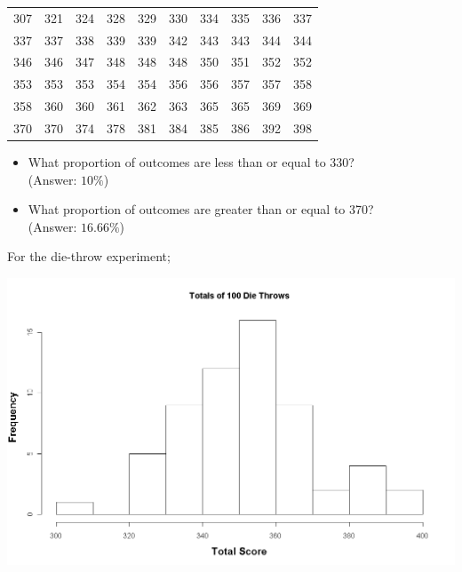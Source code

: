 \documentclass[12pt]{report}
\begin{document}
{{	
	\small
	\begin{center}
		\begin{tabular}{|c c c c c c c c c c|}
			\hline
			307 & 321 & 324 & 328 & 329 & 330 & 334 & 335 & 336 &337 \\
			337 & 337 & 338 & 339 & 339 & 342 & 343 & 343 & 344 &344 \\
			346 & 346 & 347 & 348 & 348 & 348 & 350 & 351 & 352 &352 \\
			353 & 353 & 353 & 354 & 354 & 356 & 356 & 357 & 357 &358 \\
			358 & 360 & 360 & 361 & 362 & 363 & 365 & 365 & 369 &369 \\
			370 & 370 & 374 & 378 & 381 & 384 & 385 & 386 & 392 &398 \\
			\hline
		\end{tabular}
	\end{center}
	\normalsize
	\begin{itemize}
		\item What proportion of outcomes are less than or equal to 330? \\ (Answer: $10\%$)
		\item What proportion of outcomes are greater than or equal to 370?\\ (Answer: $16.66\%$)
	\end{itemize}
	
	For the die-throw experiment;
	\begin{center}
		\includegraphics[scale=0.30]{images/3aDieHist}
	\end{center}
	
}}
\end{document}
